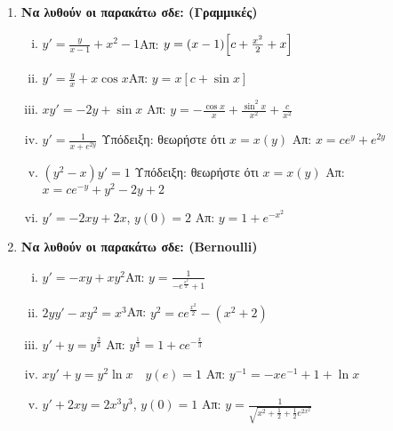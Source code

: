 \documentclass[a4paper,table]{report}
\begin{document}
\begin{center}
\end{center}

\vspace{\baselineskip}

\begin{enumerate}
  \item {\bfseries Να λυθούν οι παρακάτω σδε: (Γραμμικές)}
    \begin{enumerate}[i)]
      \item $y'=\frac{y}{x-1}+x^2-1$\hfill Απ: $y=(x-1)\Bigl[c+\frac{x^2}{2}+x\Bigr]$
      \item $y'=\frac{y}{x}+x\cos x$\hfill Απ: $y=x[c+\sin x]$
      \item $xy'=-2y+ \sin{x}$ \hfill Απ: $ y= - \frac{\cos{x}}{x} +
        \frac{\sin^{2}{x}}{x^{2}} + \frac{c}{x^{2}} $ 
      \item $y'=\frac{1}{x+e^{2y}}$ \quad 
        \textcolor{Col1}{Υπόδειξη:} θεωρήστε ότι $ x=x(y) $ \hfill Απ: $x=ce^y+e^{2y}$ 
      \item $ (y^{2}-x)y'=1 $ \quad \textcolor{Col1}{Υπόδειξη:} θεωρήστε ότι $ x=x(y) $ 
        \hfill Απ: $ x = ce^{-y}+y^{2}-2y+2 $ 
      \item $ y'=-2xy+2x $, \quad $ y(0)=2 $ \hfill Απ: $ y=1+e^{-x^{2}} $  
    \end{enumerate}

  \item {\bfseries Να λυθούν οι παρακάτω σδε: \textlatin{(Bernoulli)}}
    \begin{enumerate}[i)]
      \item $y'=-xy+xy^2$\hfill Απ: $y=\frac{1}{-e^{\frac{x^2}{2}}+1}$
      \item $2yy'-xy^2=x^3$\hfill Απ: $y^2=ce^{\frac{x^2}{2}}-(x^2+2)$
      \item $y'+y=y^{\frac{2}{3}}$ \hfill Απ: $y^{\frac{1}{3}}=1+ce^{-\frac{x}{3}}$
      \item $xy'+y=y^{2}\ln x \quad y(e)=1$ \hfill Απ: $y^{-1}=-xe^{-1}+1+\ln x$
      \item $ y'+2xy=2x^{3}y^{3} $, \quad $ y(0)=1 $ 
        \hfill Απ: $ y=\frac{1}{\sqrt{x^{2}+ \frac{1}{2}+\frac{1}{2} e^{2x^{2}}}} $ 
    \end{enumerate}



\end{enumerate}
\end{document}
